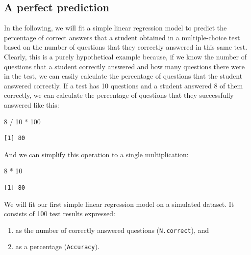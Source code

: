 \documentclass[
  letterpaper,
  DIV=11,
  numbers=noendperiod]{scrreprt}
\newenvironment{Shaded}{\begin{snugshade}}{\end{snugshade}}
\newcommand{\DecValTok}[1]{\textcolor[rgb]{0.68,0.00,0.00}{#1}}
\newcommand{\SpecialCharTok}[1]{\textcolor[rgb]{0.37,0.37,0.37}{#1}}
\providecommand{\tightlist}{%
  \setlength{\itemsep}{0pt}\setlength{\parskip}{0pt}}
\begin{document}
\subsection{A perfect prediction}\label{a-perfect-prediction}

In the following, we will fit a simple linear regression model to
predict the percentage of correct answers that a student obtained in a
multiple-choice test based on the number of questions that they
correctly answered in this same test. Clearly, this is a purely
hypothetical example because, if we know the number of questions that a
student correctly answered and how many questions there were in the
test, we can easily calculate the percentage of questions that the
student answered correctly. If a test has 10 questions and a student
answered 8 of them correctly, we can calculate the percentage of
questions that they successfully answered like this:

\begin{Shaded}
\begin{Highlighting}[]
\DecValTok{8} \SpecialCharTok{/} \DecValTok{10} \SpecialCharTok{*} \DecValTok{100}
\end{Highlighting}
\end{Shaded}

\begin{verbatim}
[1] 80
\end{verbatim}

And we can simplify this operation to a single multiplication:

\begin{Shaded}
\begin{Highlighting}[]
\DecValTok{8} \SpecialCharTok{*} \DecValTok{10}
\end{Highlighting}
\end{Shaded}

\begin{verbatim}
[1] 80
\end{verbatim}

We will fit our first simple linear regression model on a simulated
dataset. It consists of 100 test results expressed:

\begin{enumerate}
\def\labelenumi{\alph{enumi}.}
\tightlist
\item
  as the number of correctly answered questions (\texttt{N.correct}),
  and
\item
  as a percentage (\texttt{Accuracy}).
\end{enumerate}
\end{document}
